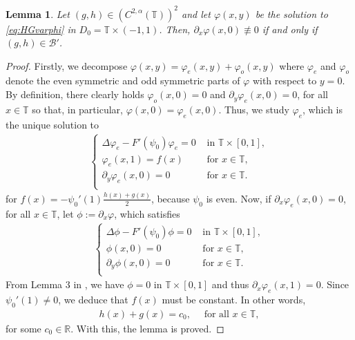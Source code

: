 \documentclass[11pt,reqno]{amsproc}
\newcommand{\R}{\mathbb{R}}
\newcommand{\B}{\mathcal{B}}
\numberwithin{equation}{section}
\numberwithin{theorem}{section}
\numberwithin{prop}{section}
\numberwithin{cor}{section}
\newtheorem{lemma}{Lemma}
\numberwithin{lemma}{section}
\theoremstyle{remark}
\theoremstyle{definition}
\begin{document}
\begin{lemma}\label{lemma:pxvarphi0}
Let $(g,h)\in (C^{2,\alpha}(\mathbb{T}))^2$ and let $\varphi(x,y)$ be the solution to \eqref{eq:HGvarphi} in $D_0=\mathbb{T}\times(-1,1)$. Then, $\partial_x\varphi(x,0)\not \equiv 0$ if and only if $(g,h)\in \B'$.
\end{lemma}

\begin{proof}
Firstly, we decompose $\varphi(x,y) = \varphi_e(x,y) + \varphi_o(x,y)$ where $\varphi_e$ and $\varphi_o$ denote the even symmetric and odd symmetric parts of $\varphi$ with respect to $y=0$. By definition, there clearly holds $\varphi_o(x,0) = 0$ and $\partial_y\varphi_e(x,0) = 0$, for all $x\in\mathbb{T}$ so that, in particular, $\varphi(x,0) = \varphi_e(x,0)$. Thus, we study $\varphi_e$, which is the unique solution to
 \begin{align}\label{eq:ellipticevenF}
\begin{cases}
\Delta\varphi_e-F'(\psi_0)\varphi_e= 0 & \text{ in } \mathbb{T}\times[0,1], \\
\varphi_e(x,1)= f(x) & \text{ for } x\in \mathbb{T}, \\
\partial_y\varphi_e(x,0)= 0 & \text{ for } x\in\mathbb{T}. \\
\end{cases}
\end{align}
for $f(x) = -\psi_0'(1)\frac{h(x)+ g(x)}{2}$, because $\psi_0$ is even. Now, if $\partial_x\varphi_e(x,0)=0$, for all $x\in \mathbb{T}$, let $\phi:=\partial_x\varphi$, which satisfies
 \begin{align}\label{eq:ellipticphi}
\begin{cases}
\Delta\phi-F'(\psi_0)\phi= 0 & \text{ in } \mathbb{T}\times[0,1], \\
\phi(x,0)=0 & \text{ for } x\in \mathbb{T}, \\
\partial_y\phi(x,0)= 0 & \text{ for } x\in\mathbb{T}. \\
\end{cases}
\end{align}
From Lemma 3 in \cite{drivas2024islands}, we have $\phi=0$ in $\mathbb{T}\times[0,1]$ and thus $\partial_x\varphi_e(x,1)=0$. Since $\psi_0'(1)\neq 0$, we deduce that $f(x)$ must be constant. In other words,
\begin{align}\label{eq:islandcondition}
h(x) + g(x) = c_0, \quad \text{ for all }x\in \mathbb{T},
\end{align}
for some $c_0\in \R$. With this, the lemma is proved.
\end{proof}
\end{document}
